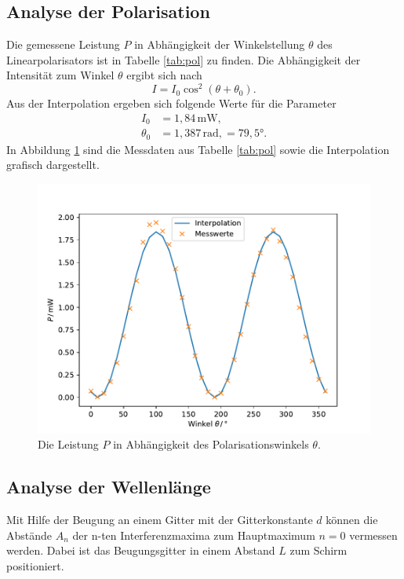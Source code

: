 \subsection{Analyse der Polarisation}
Die gemessene Leistung $P$ in Abhängigkeit der Winkelstellung $\theta$ des Linearpolarisators ist in Tabelle \ref{tab:pol} zu finden.
Die Abhängigkeit der Intensität zum Winkel $\theta$ ergibt sich nach
\begin{equation}
    I=I_0\cos^2(\theta+\theta_0).
\end{equation}
Aus der Interpolation ergeben sich folgende Werte für die Parameter
\begin{align*}
    I_0&=1,84\,\text{mW}{,}\\
    \theta_0&=1,387\,\text{rad}{,}=79,5°.
\end{align*}
In Abbildung \ref{fig:pol} sind die Messdaten aus Tabelle \ref{tab:pol} sowie die Interpolation grafisch dargestellt.
\begin{figure}
    \center
    \includegraphics[width=\textwidth]{plots/pol.pdf}
    \caption{Die Leistung $P$ in Abhängigkeit des Polarisationswinkels $\theta$.}
    \label{fig:pol}
\end{figure}


\subsection{Analyse der Wellenlänge}
Mit Hilfe der Beugung an einem Gitter mit der Gitterkonstante $d$ können die Abstände $A_n$
der n-ten Interferenzmaxima zum Hauptmaximum $n=0$ vermessen werden. Dabei ist das Beugungsgitter
in einem Abstand $L$ zum Schirm positioniert.\\

